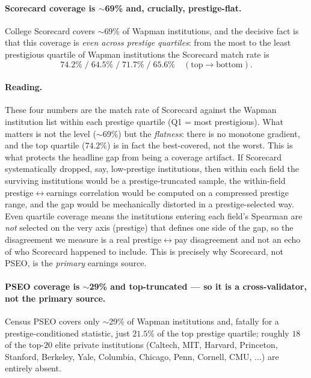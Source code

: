 \documentclass[11pt]{article}
\begin{document}
\paragraph{Scorecard coverage is $\sim$69\% and, crucially, prestige-flat.} College Scorecard covers $\sim$69\% of Wapman institutions, and the decisive fact is that this coverage is \emph{even across prestige quartiles}: from the most to the least prestigious quartile of Wapman institutions the Scorecard match rate is
\[
74.2\% \;/\; 64.5\% \;/\; 71.7\% \;/\; 65.6\% \quad (\text{top}\to\text{bottom}).
\]
\paragraph{Reading.} These four numbers are the match rate of Scorecard against the Wapman institution list within each prestige quartile (Q1 = most prestigious). What matters is not the level ($\sim$69\%) but the \emph{flatness}: there is no monotone gradient, and the top quartile ($74.2\%$) is in fact the best-covered, not the worst. This is what protects the headline gap from being a coverage artifact. If Scorecard systematically dropped, say, low-prestige institutions, then within each field the surviving institutions would be a prestige-truncated sample, the within-field prestige$\leftrightarrow$earnings correlation would be computed on a compressed prestige range, and the gap would be mechanically distorted in a prestige-selected way. Even quartile coverage means the institutions entering each field's Spearman are \emph{not} selected on the very axis (prestige) that defines one side of the gap, so the disagreement we measure is a real prestige$\leftrightarrow$pay disagreement and not an echo of who Scorecard happened to include. This is precisely why Scorecard, not PSEO, is the \emph{primary} earnings source.

\paragraph{PSEO coverage is $\sim$29\% and top-truncated --- so it is a cross-validator, not the primary source.} Census PSEO covers only $\sim$29\% of Wapman institutions and, fatally for a prestige-conditioned statistic, just $21.5\%$ of the top prestige quartile; roughly $18$ of the top-$20$ elite private institutions (Caltech, MIT, Harvard, Princeton, Stanford, Berkeley, Yale, Columbia, Chicago, Penn, Cornell, CMU, $\dots$) are entirely absent.
\end{document}

